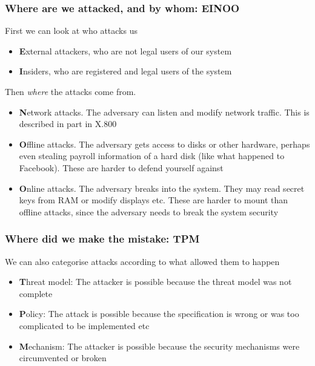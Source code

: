 \documentclass[14pt]{beamer}
\begin{document}
    \begin{frame}
        \frametitle{Where are we attacked, and by whom: EINOO}
            First we can look at who attacks us
            \begin{itemize}
                \item \textbf{E}xternal attackers, who are not legal users of our system
                \item \textbf{I}nsiders, who are registered and legal users of the system
            \end{itemize}
            Then \textit{where} the attacks come from. 
            \begin{itemize}
                \item \textbf{N}etwork attacks. The adversary can listen and modify network traffic. This is described in part in X.800
                \item \textbf{O}ffline attacks. The adversary gets access to disks or other hardware, perhaps even stealing payroll information of a hard disk (like what happened to Facebook). These are harder to defend yourself against
                \item \textbf{O}nline attacks. The adversary breaks into the system. They may read secret keys from RAM or modify displays etc. These are harder to mount than offline attacks, since the adversary needs to break the system security
            \end{itemize}
    \end{frame}
    \begin{frame}
        \frametitle{Where did we make the mistake: TPM}
            We can also categorise attacks according to what allowed them to happen
            \begin{itemize}
                \item \textbf{T}hreat model: The attacker is possible because the threat model was not complete
                \item \textbf{P}olicy: The attack is possible because the specification is wrong or was too complicated to be implemented etc
                \item \textbf{M}echanism: The attacker is possible because the security mechanisms were circumvented or broken
            \end{itemize}
    \end{frame}

\end{document}
